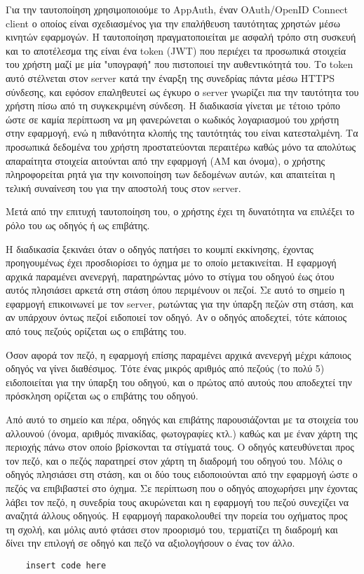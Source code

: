 \documentclass[../thesis.tex]{subfiles}
\begin{document}
Για την ταυτοποίηση χρησιμοποιούμε το AppAuth, έναν OAuth/OpenID Connect client ο οποίος είναι σχεδιασμένος για την επαλήθευση ταυτότητας χρηστών μέσω κινητών εφαρμογών.
Η ταυτοποίηση πραγματοποιείται με ασφαλή τρόπο στη συσκευή και το αποτέλεσμα της είναι ένα token (JWT) που περιέχει τα προσωπικά στοιχεία του χρήστη μαζί με μία "υπογραφή" που πιστοποιεί την αυθεντικότητά του.
Το token αυτό στέλνεται στον server κατά την έναρξη της συνεδρίας πάντα μέσω HTTPS σύνδεσης, και εφόσον επαληθευτεί ως έγκυρο ο server γνωρίζει πια την ταυτότητα του χρήστη πίσω από τη συγκεκριμένη σύνδεση.
Η διαδικασία γίνεται με τέτοιο τρόπο ώστε σε καμία περίπτωση να μη φανερώνεται ο κωδικός λογαριασμού του χρήστη στην εφαρμογή, ενώ η πιθανότητα κλοπής της ταυτότητάς του είναι κατεσταλμένη.
Τα προσωπικά δεδομένα του χρήστη προστατεύονται περαιτέρω καθώς μόνο τα απολύτως απαραίτητα στοιχεία αιτούνται από την εφαρμογή (ΑΜ και όνομα), ο χρήστης πληροφορείται ρητά για την κοινοποίηση των δεδομένων αυτών, και απαιτείται η τελική συναίνεση του για την αποστολή τους στον server.

Μετά από την επιτυχή ταυτοποίηση του, ο χρήστης έχει τη δυνατότητα να επιλέξει το ρόλο του ως οδηγός ή ως επιβάτης.

Η διαδικασία ξεκινάει όταν ο οδηγός πατήσει το κουμπί εκκίνησης, έχοντας προηγουμένως έχει προσδιορίσει το όχημα με το οποίο μετακινείται.
Η εφαρμογή αρχικά παραμένει ανενεργή, παρατηρώντας μόνο το στίγμα του οδηγού έως ότου αυτός πλησιάσει αρκετά στη στάση όπου περιμένουν οι πεζοί.
Σε αυτό το σημείο η εφαρμογή επικοινωνεί με τον server, ρωτώντας για την ύπαρξη πεζών στη στάση, και αν υπάρχουν όντως πεζοί ειδοποιεί τον οδηγό.
Αν ο οδηγός αποδεχτεί, τότε κάποιος από τους πεζούς ορίζεται ως ο επιβάτης του.

Όσον αφορά τον πεζό, η εφαρμογή επίσης παραμένει αρχικά ανενεργή μέχρι κάποιος οδηγός να γίνει διαθέσιμος.
Τότε ένας μικρός αριθμός από πεζούς (το πολύ 5) ειδοποιείται για την ύπαρξη του οδηγού, και ο πρώτος από αυτούς που αποδεχτεί την πρόσκληση ορίζεται ως ο επιβάτης του οδηγού.

Από αυτό το σημείο και πέρα, οδηγός και επιβάτης παρουσιάζονται με τα στοιχεία του αλλουνού (όνομα, αριθμός πινακίδας, φωτογραφίες κτλ.) καθώς και με έναν χάρτη της περιοχής πάνω στον οποίο βρίσκονται τα στίγματά τους.
Ο οδηγός κατευθύνεται προς τον πεζό, και ο πεζός παρατηρεί στον χάρτη τη διαδρομή του οδηγού του.
Μόλις ο οδηγός πλησιάσει στη στάση, και οι δύο τους ειδοποιούνται από την εφαρμογή ώστε ο πεζός να επιβιβαστεί στο όχημα.
Σε περίπτωση που ο οδηγός αποχωρήσει μην έχοντας λάβει τον πεζό, η συνεδρία τους ακυρώνεται και η εφαρμογή του πεζού συνεχίζει να αναζητά άλλους οδηγούς.
Η εφαρμογή παρακολουθεί την πορεία του οχήματος προς τη σχολή, και μόλις αυτό φτάσει στον προορισμό του, τερματίζει τη διαδρομή και δίνει την επιλογή σε οδηγό και πεζό να αξιολογήσουν ο ένας τον άλλο.


\begin{verbatim}
    insert code here
\end{verbatim}
\end{document}
